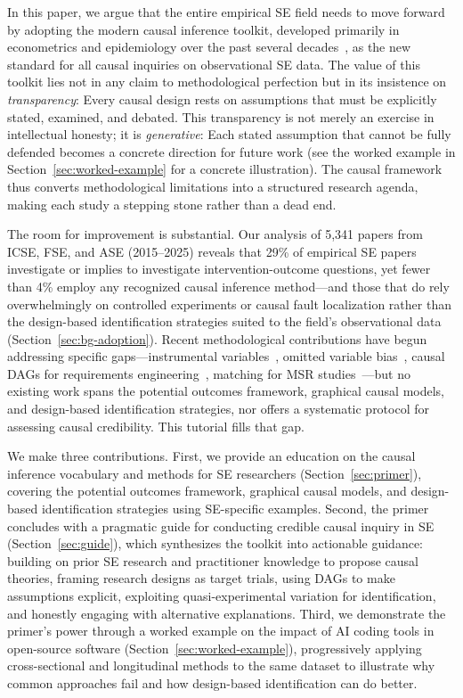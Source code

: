In this paper, we argue that the entire empirical SE field needs to move forward by adopting the modern causal inference toolkit, developed primarily in econometrics and epidemiology over the past several decades~\cite{angrist2010credibility, pearl2009causality, cunningham2021causal}, as the new standard for all causal inquiries on observational SE data.
The value of this toolkit lies not in any claim to methodological perfection but in its insistence on \emph{transparency}: Every causal design rests on assumptions that must be explicitly stated, examined, and debated.
This transparency is not merely an exercise in intellectual honesty; it is \emph{generative}: Each stated assumption that cannot be fully defended becomes a concrete direction for future work (see the worked example in Section~\ref{sec:worked-example} for a concrete illustration).
The causal framework thus converts methodological limitations into a structured research agenda, making each study a stepping stone rather than a dead end.

The room for improvement is substantial.
Our analysis of 5,341 papers from ICSE, FSE, and ASE (2015--2025) reveals that 29\% of empirical SE papers investigate or implies to investigate intervention-outcome questions, yet fewer than 4\% employ any recognized causal inference method---and those that do rely overwhelmingly on controlled experiments or causal fault localization rather than the design-based identification strategies suited to the field's observational data (Section~\ref{sec:bg-adoption}).
Recent methodological contributions have begun addressing specific gaps---instrumental variables~\cite{DBLP:journals/tosem/GrafVlachyW24}, omitted variable bias~\cite{DBLP:journals/corr/abs-2501-17026}, causal DAGs for requirements engineering~\cite{DBLP:journals/corr/abs-2511-03875}, matching for MSR studies~\cite{DBLP:conf/msr/NoceraSLTV26}---but no existing work spans the potential outcomes framework, graphical causal models, and design-based identification strategies, nor offers a systematic protocol for assessing causal credibility.
This tutorial fills that gap.

We make three contributions.
First, we provide an education on the causal inference vocabulary and methods for SE researchers (Section~\ref{sec:primer}), covering the potential outcomes framework, graphical causal models, and design-based identification strategies using SE-specific examples.
Second, the primer concludes with a pragmatic guide for conducting credible causal inquiry in SE (Section~\ref{sec:guide}), which synthesizes the toolkit into actionable guidance: building on prior SE research and practitioner knowledge to propose causal theories, framing research designs as target trials, using DAGs to make assumptions explicit, exploiting quasi-experimental variation for identification, and honestly engaging with alternative explanations.
Third, we demonstrate the primer's power through a worked example on the impact of AI coding tools in open-source software (Section~\ref{sec:worked-example}), progressively applying cross-sectional and longitudinal methods to the same dataset to illustrate why common approaches fail and how design-based identification can do better.

